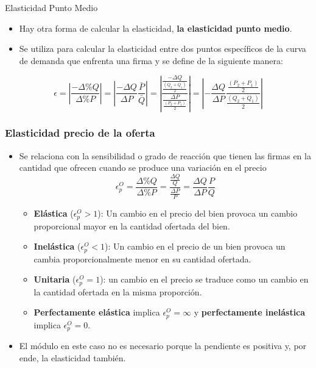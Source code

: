 \documentclass{beamer}
\begin{document}
\begin{frame}{Elasticidad Punto Medio}
  \begin{itemize}
      \item Hay otra forma de calcular la elasticidad, \textbf{la elasticidad punto medio}.
      \item Se utiliza para calcular la elasticidad entre dos puntos
      específicos de la curva de demanda que enfrenta una firma y se define
      de la siguiente manera:
    \end{itemize}
    \begin{equation*}
      \epsilon = \left|\frac{- \Delta \% Q}{\Delta \% P}\right|= \left|\frac{- \Delta Q}{\Delta P} \frac{\bar P}{\bar Q}\right| = \left|\frac{\frac{- \Delta Q}{\frac{(Q_2+Q_1)}{2}}}{\frac{\Delta P}{\frac{(P_2+P_1)}{2}}}\right| = \left|-\frac{\Delta Q}{\Delta P} \frac{\frac{(P_2+P_1)}{2}}{\frac{(Q_2+Q_1)}{2}}\right|
    \end{equation*}
\end{frame}

\begin{frame}
    \frametitle{Elasticidad precio de la oferta}
      \begin{itemize}
        \item Se relaciona con la sensibilidad o grado de reacción que tienen las firmas en la cantidad que ofrecen cuando se produce una variación en el precio
        \begin{equation*}
          \epsilon^{O}_p = \frac{\Delta \% Q}{\Delta \% P} = \frac{\frac{\Delta Q}{Q}}{\frac{\Delta P}{P}} = \frac{\Delta Q}{\Delta P} \frac{P}{Q}
        \end{equation*}
        \vspace{-2mm}
        \begin{itemize}
          \item \textbf{Elástica} ($\epsilon^{O}_p>1$): Un cambio en el precio del bien provoca un cambio
          proporcional mayor en la cantidad ofertada del bien.
          \item \textbf{Inelástica} ($\epsilon^{O}_p<1$): Un cambio en el precio de un bien provoca un cambia proporcionalmente menor en su cantidad ofertada.
          \item \textbf{Unitaria} ($\epsilon^{O}_p=1$): un cambio en el precio se traduce como un cambio en la
          cantidad ofertada en la misma proporción.
          \item \textbf{Perfectamente elástica} implica $\epsilon^{O}_p=\infty$ y \textbf{perfectamente inelástica} implica $\epsilon^{O}_p=0$.
        \end{itemize}
          \item El módulo en este caso no es necesario porque la pendiente es positiva y, por ende, la elasticidad también.
       \end{itemize}
\end{frame}
    
\end{document}
